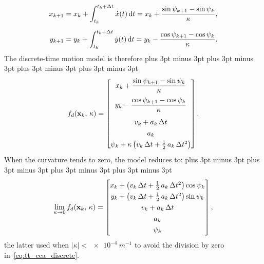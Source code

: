 \begin{equation}
    \renewcommand{\arraystretch}{1.3}\setlength{\jot}{8pt}
    \begin{aligned}
        x_{k+1} &= x_k + \int_{t_k}^{t_k+\Delta t} \dot x(t)\,\mathrm{d}t
                 = x_k + \frac{\sin\psi_{k+1} - \sin\psi_k}{\kappa}, \\
        y_{k+1} &= y_k + \int_{t_k}^{t_k+\Delta t} \dot y(t)\,\mathrm{d}t
                 = y_k - \frac{\cos\psi_{k+1} - \cos\psi_k}{\kappa}.
    \end{aligned}
    \label{eq:tt_cca_xy}
\end{equation}
The discrete-time motion model is therefore
\abovedisplayskip=16pt plus 3pt minus 3pt \belowdisplayskip=16pt plus 3pt minus 3pt
\abovedisplayshortskip=16pt plus 3pt minus 3pt \belowdisplayshortskip=16pt plus 3pt minus 3pt
\begin{equation}
    \renewcommand{\arraystretch}{1.3}\setlength{\jot}{8pt}
    f_d(\mathbf{x}_k,\,\kappa) =
    \begin{bmatrix}
        x_k + \dfrac{\sin\psi_{k+1} - \sin\psi_k}{\kappa} \\[2ex]
        y_k - \dfrac{\cos\psi_{k+1} - \cos\psi_k}{\kappa} \\[2ex]
        v_k + a_k\,\Delta t \\
        a_k \\
        \psi_k + \kappa\left(v_k\,\Delta t + \tfrac{1}{2}\,a_k\,\Delta t^2\right)
    \end{bmatrix}.
    \label{eq:tt_cca_discrete}
\end{equation}
When the curvature tends to zero,  the
model reduces to:
\abovedisplayskip=16pt plus 3pt minus 3pt \belowdisplayskip=16pt plus 3pt minus 3pt
\abovedisplayshortskip=16pt plus 3pt minus 3pt \belowdisplayshortskip=16pt plus 3pt minus 3pt
\begin{equation}
    \renewcommand{\arraystretch}{1.3}\setlength{\jot}{8pt}
    \lim_{\kappa \to 0} f_d(\mathbf{x}_k,\,\kappa) =
    \begin{bmatrix}
        x_k + \left(v_k\,\Delta t + \tfrac{1}{2}\,a_k\,\Delta t^2\right)\cos\psi_k \\
        y_k + \left(v_k\,\Delta t + \tfrac{1}{2}\,a_k\,\Delta t^2\right)\sin\psi_k \\
        v_k + a_k\,\Delta t \\
        a_k \\
        \psi_k
    \end{bmatrix},
    \label{eq:tt_cca_straight}
\end{equation}
the latter used when $|\kappa| < \SI{e-4}{m^{-1}}$ to avoid the division by zero
in~\eqref{eq:tt_cca_discrete}.

